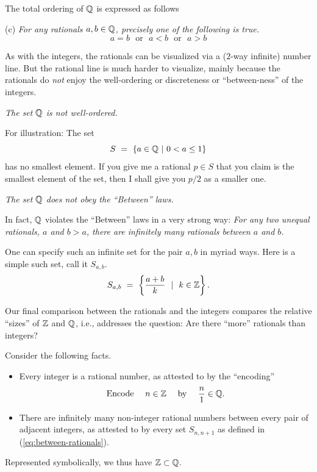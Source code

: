 \medskip

\noindent
The total ordering of $\mathbb{Q}$ is expressed as follows 

\noindent (c)
{\it For any rationals $a, b \in \mathbb{Q}$, precisely one of the following
  is                               
  true.}
\[  a=b \ \ \ \mbox{or} \ \ \  a<b \ \ \ \mbox{or} \ \ \ a>b \]

\bigskip

As with the integers, the rationals can be visualized via a ($2$-way
infinite) number line.  But the rational line is much harder to
visualize, mainly because the rationals do {\em not} enjoy the
well-ordering or discreteness or ``between-ness'' of the integers.

\medskip

\noindent
{\em The set $\mathbb{Q}$ is {\em not} well-ordered.}

For illustration:  The set
\[ S \ = \ \{ a \in \mathbb{Q}  \ |\ 0 < a \leq 1 \} \]
has no smallest element.  If you give me a rational $p \in S$ that you
claim is the smallest element of the set, then I shall give you $p/2$
as a smaller one.

\medskip

\noindent
{\em The set $\mathbb{Q}$ does {\em not} obey the ``Between'' laws.}

In fact, $\mathbb{Q}$ violates the ``Between'' laws in a very strong way:
{\it For any two unequal rationals, $a$ and $b>a$, there are
  infinitely many rationals between $a$ and $b$.}

One can specify such an infinite set for the pair $a,b$ in myriad
ways.  Here is a simple such set, call it $S_{a,b}$.
\begin{equation}
\label{eq:between-rationals}
S_{a,b} \ = \ \left\{ \frac{a+b}{k} \ \ | \ \ k \in \mathbb{Z} \right\}.
\end{equation}

\bigskip

Our final comparison between the rationals and the integers compares
the relative ``sizes'' of $\mathbb{Z}$ and $\mathbb{Q}$, i.e., addresses the question:
Are there ``more'' rationals than integers?

\noindent Consider the following facts.
\begin{itemize}
\item
Every integer is a rational number, as attested to by the ``encoding''
\begin{equation}
\label{eq:ZintoQ}
\mbox{Encode } \ \ \ n \in \mathbb{Z} \ \ \ \mbox{ by } \ \ \ {n \over 1} \in \mathbb{Q} .
\end{equation}

\item
There are infinitely many non-integer rational numbers between every
pair of adjacent integers, as attested to by every set $S_{n,n+1}$ as
defined in (\ref{eq:between-rationals}).
\end{itemize}
Represented symbolically, we thus have $\mathbb{Z} \subset \mathbb{Q}$.

